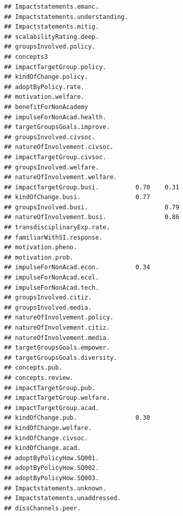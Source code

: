 \documentclass[
]{article}
\begin{document}
\begin{verbatim}
## Impactstatements.emanc.                        
## Impactstatements.understanding.                
## Impactstatements.mitig.                        
## scalabilityRating.deep.                        
## groupsInvolved.policy.                         
## concepts3                                      
## impactTargetGroup.policy.                      
## kindOfChange.policy.                           
## adoptByPolicy.rate.                            
## motivation.welfare.                            
## benefitForNonAcademy                           
## impulseForNonAcad.health.                      
## targetGroupsGoals.improve.                     
## groupsInvolved.civsoc.                         
## natureOfInvolvement.civsoc.                    
## impactTargetGroup.civsoc.                      
## groupsInvolved.welfare.                        
## natureOfInvolvement.welfare.                   
## impactTargetGroup.busi.          0.70    0.31  
## kindOfChange.busi.               0.77          
## groupsInvolved.busi.                     0.79  
## natureOfInvolvement.busi.                0.86  
## transdisciplinaryExp.rate.                     
## familiarWithSI.response.                       
## motivation.pheno.                              
## motivation.prob.                               
## impulseForNonAcad.econ.          0.34          
## impulseForNonAcad.ecol.                        
## impulseForNonAcad.tech.                        
## groupsInvolved.citiz.                          
## groupsInvolved.media.                          
## natureOfInvolvement.policy.                    
## natureOfInvolvement.citiz.                     
## natureOfInvolvement.media.                     
## targetGroupsGoals.empower.                     
## targetGroupsGoals.diversity.                   
## concepts.pub.                                  
## concepts.review.                               
## impactTargetGroup.pub.                         
## impactTargetGroup.welfare.                     
## impactTargetGroup.acad.                        
## kindOfChange.pub.                0.30          
## kindOfChange.welfare.                          
## kindOfChange.civsoc.                           
## kindOfChange.acad.                             
## adoptByPolicyHow.SQ001.                        
## adoptByPolicyHow.SQ002.                        
## adoptByPolicyHow.SQ003.                        
## Impactstatements.unknown.                      
## Impactstatements.unaddressed.                  
## dissChannels.peer.                             

\end{verbatim}
\end{document}
